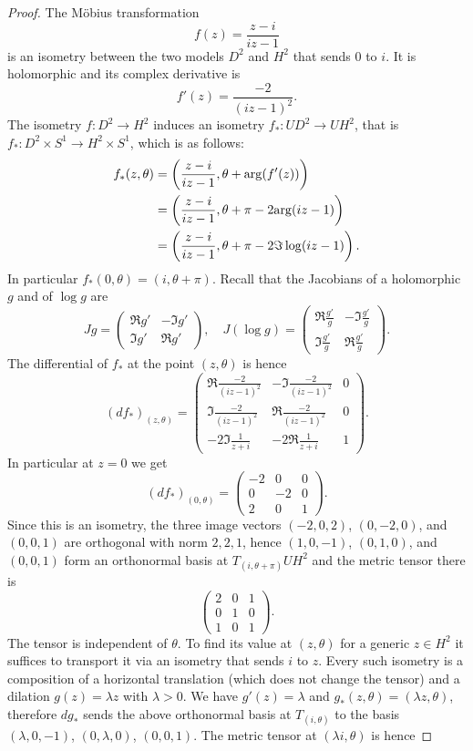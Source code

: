 \begin{proof}
The M\"obius transformation
$$f(z) = \frac{z - i}{i z - 1}$$
is an isometry between the two models $D^2$ and $H^2$ that sends $0$ to $i$. 
It is holomorphic and its complex derivative is
$$f'(z) = \frac{-2}{(iz-1)^2}.$$
The isometry $f\colon D^2\to H^2$ induces an isometry $f_*\colon UD^2 \to UH^2$, that is $f_*\colon D^2\times S^1 \to H^2 \times S^1$, which is as follows:
\begin{align*}
f_*(z,\theta) & = \left(\frac{z-i}{iz-1}, \theta + {\rm arg} (f'(z))\right) \\
& = \left(\frac{z-i}{iz-1}, \theta +\pi - 2 {\rm arg} (iz-1)\right)  \\
& = \left(\frac{z-i}{iz-1}, \theta +\pi - 2 \Im \log (iz-1)\right).  
\end{align*}
In particular $f_*(0,\theta) = (i, \theta + \pi)$.
Recall that the Jacobians of a holomorphic $g$ and of $\log g$ are
$$
Jg = \begin{pmatrix} \Re g' & -\Im g' \\ \Im g' & \Re g' \end{pmatrix},
\quad
J(\log g) = \begin{pmatrix} \Re \frac{g'}g & -\Im \frac{g'}g \\ \Im \frac{g'}g & \Re \frac{g'}g \end{pmatrix}.
$$
The differential of $f_*$ at the point $(z,\theta)$ is hence
$$
(df_*)_{(z,\theta)} =
\begin{pmatrix}
\Re \frac{-2}{(iz-1)^2} & - \Im \frac{-2}{(iz-1)^2} & 0 \\
\Im \frac{-2}{(iz-1)^2} & \Re \frac{-2}{(iz-1)^2} & 0 \\
-2 \Im \frac{1}{z+i} & - 2 \Re \frac{1}{z+i} & 1 
\end{pmatrix}.
$$
In particular at $z=0$ we get
$$
(df_*)_{(0,\theta)} =
\begin{pmatrix}
-2 & 0 & 0 \\ 
0 & -2 & 0 \\
2 & 0 & 1 
\end{pmatrix}.
$$
Since this is an isometry, the three image vectors $(-2,0,2)$, $(0,-2,0)$, and $(0,0,1)$ are orthogonal with norm $2,2,1$, hence $(1,0,-1)$, $(0,1,0)$, and $(0,0,1)$ form an orthonormal basis at $T_{(i,\theta+\pi)}UH^2$ and the metric tensor there is
$$\begin{pmatrix}
2 & 0 & 1 \\
0 & 1 & 0 \\
1 & 0 & 1
\end{pmatrix}.
$$
The tensor is independent of $\theta$. To find its value at $(z,\theta)$ for a generic $z\in H^2$ it suffices to transport it via an isometry that sends $i$ to $z$. Every such isometry is a composition of a horizontal translation (which does not change the tensor) and a dilation $g(z) = \lambda z$ with $\lambda >0$. We have $g'(z) = \lambda$ and $g_*(z,\theta) = (\lambda z, \theta)$, therefore $dg_*$ sends the above orthonormal basis at $T_{(i,\theta)}$ to the basis $(\lambda, 0, -1)$, $(0,\lambda,0)$, $(0,0,1)$. The metric tensor at $(\lambda i, \theta)$ is hence

\end{proof}
